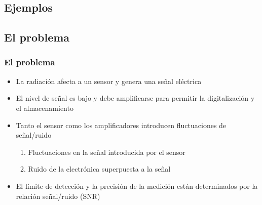 \documentclass{beamer}
\begin{document}
\subsection{Ejemplos}

\subsection{El problema}

\begin{frame}
\frametitle{El problema}
\begin{alertblock}{}
\begin{itemize}[<+->]
\item La radiación afecta a un sensor y genera una señal eléctrica

\item El nivel de señal es bajo y debe amplificarse para permitir la digitalización y
el almacenamiento

\item Tanto el sensor como los amplificadores introducen fluctuaciones de señal/ruido
\begin{enumerate}
\item Fluctuaciones en la señal introducida por el sensor
\item Ruido de la electrónica superpuesta a la señal
\end{enumerate}

\item El límite de detección y la precisión de la medición están
determinados por la relación señal/ruido (SNR)
\end{itemize}
\end{alertblock}

\end{frame}
\end{document}
